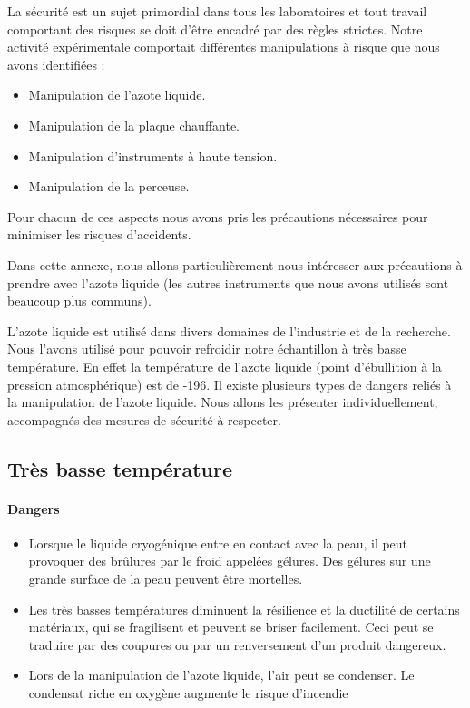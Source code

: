 La sécurité est un sujet primordial dans tous les laboratoires et tout travail comportant des risques se doit d'être encadré par des règles strictes. Notre activité expérimentale comportait différentes manipulations à risque que nous avons identifiées : 

\begin{itemize}
  \item Manipulation de l'azote liquide.
  \item Manipulation de la plaque chauffante.
  \item Manipulation d'instruments à haute tension.
  \item Manipulation de la perceuse.
\end{itemize}

\bigskip
Pour chacun de ces aspects nous avons pris les précautions nécessaires pour minimiser les risques d'accidents.

Dans cette annexe, nous allons particulièrement nous intéresser aux précautions à prendre avec l'azote liquide (les autres instruments que nous avons utilisés sont beaucoup plus communs).

L'azote liquide est utilisé dans divers domaines de l'industrie et de la recherche. Nous l'avons utilisé pour pouvoir refroidir notre échantillon à très basse température. En effet la température de l’azote liquide (point d’ébullition à la pression atmosphérique) est de -196\celsius{}. 
Il existe plusieurs types de dangers reliés à la manipulation de l'azote liquide. Nous allons les présenter individuellement, accompagnés des mesures de sécurité à respecter.

\subsection{Très basse température}

\paragraph{Dangers}

\begin{itemize}
  \item Lorsque le liquide cryogénique entre en contact avec la peau, il peut provoquer des 
brûlures par le froid appelées gélures. Des gélures sur une grande surface de la peau peuvent être mortelles. 
  \item Les très basses températures diminuent la résilience et la ductilité de certains 
matériaux, qui se fragilisent et peuvent se briser facilement. Ceci peut se traduire par des coupures ou par un renversement d'un produit dangereux.
  \item Lors de la manipulation de l'azote liquide, l’air peut se condenser. Le condensat riche en oxygène augmente le risque d'incendie 
\end{itemize}


